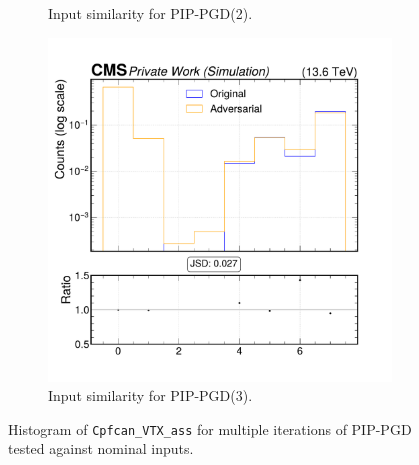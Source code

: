 \begin{figure}[htbp]
\begin{subfigure}[t]{0.32\textwidth}
    \caption*{Input similarity for PIP-PGD(2).}
  \end{subfigure}\hfill
  \begin{subfigure}[t]{0.32\textwidth}
    \includegraphics[width=\linewidth]{media/output/features/compare/combined_it_3/cmp_cpf_arr_Cpfcan_VTX_ass.pdf}
    \caption*{Input similarity for PIP-PGD(3).}
  \end{subfigure}

  \caption*{Histogram of \texttt{Cpfcan\_VTX\_ass} for multiple iterations of PIP-PGD tested against nominal inputs.}
  \label{fig:combined_input_Cpfcan_VTX_ass}
\end{figure}


